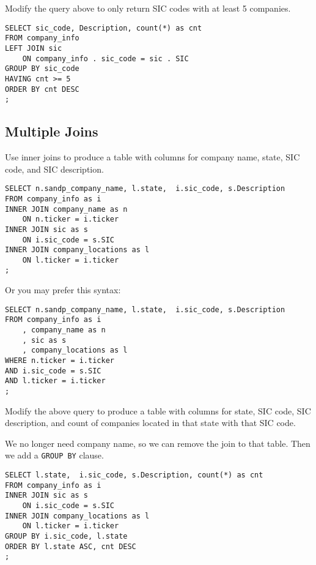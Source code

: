 \documentclass[10pt]{exam}
\begin{document}
\begin{questions}
\question Modify the query above to only return SIC codes with at least
5 companies.

\begin{solution}
\begin{lstlisting}
SELECT sic_code, Description, count(*) as cnt
FROM company_info
LEFT JOIN sic
    ON company_info . sic_code = sic . SIC
GROUP BY sic_code
HAVING cnt >= 5
ORDER BY cnt DESC
;
\end{lstlisting}
\end{solution}



\subsection*{Multiple Joins}

\question Use inner joins to produce a table with columns for company name,
state, SIC code, and SIC description.

\begin{solution}
\begin{lstlisting}
SELECT n.sandp_company_name, l.state,  i.sic_code, s.Description
FROM company_info as i
INNER JOIN company_name as n
    ON n.ticker = i.ticker
INNER JOIN sic as s
    ON i.sic_code = s.SIC
INNER JOIN company_locations as l
    ON l.ticker = i.ticker
;
\end{lstlisting}

Or you may prefer this syntax:

\begin{lstlisting}
SELECT n.sandp_company_name, l.state,  i.sic_code, s.Description
FROM company_info as i
    , company_name as n
    , sic as s 
    , company_locations as l 
WHERE n.ticker = i.ticker
AND i.sic_code = s.SIC
AND l.ticker = i.ticker
;
\end{lstlisting}
\end{solution}


\question Modify the above query to 
produce a table with columns for state, SIC
code, SIC description, and count of companies located in that state
with that SIC code.

\begin{solution}

    We no longer need company name, so we can remove the join to that
    table. Then we add a \texttt{GROUP BY} clause.

\begin{lstlisting}
SELECT l.state,  i.sic_code, s.Description, count(*) as cnt
FROM company_info as i
INNER JOIN sic as s
    ON i.sic_code = s.SIC
INNER JOIN company_locations as l
    ON l.ticker = i.ticker
GROUP BY i.sic_code, l.state
ORDER BY l.state ASC, cnt DESC
;
\end{lstlisting}
\end{solution}



\end{questions}
\end{document}
